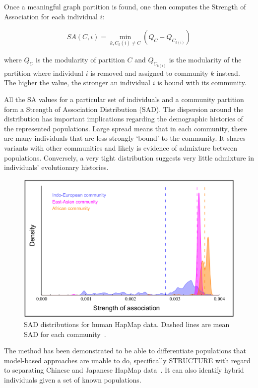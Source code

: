 \documentclass{essay}
\begin{document}
Once a meaningful graph partition is found, one then computes the Strength of
Association for each individual $i$:

\begin{align}
  SA(C, i) = \min_{k, C_k(i) \neq C} (Q_C - Q_{C_{{k}(i)}})
\end{align}

where $Q_C$ is the modularity of partition $C$ and $Q_{C_{{k}(i)}}$ is the
modularity of the partition where individual $i$ is removed and assigned to
community $k$ instead. The higher the value, the stronger an individual $i$ is
bound with its community.

All the SA values for a particular set of individuals and a community partition
form a Strength of Association Distribution (SAD). The dispersion around the
distribution has important implications regarding the demographic histories of
the represented populations. Large spread means that in each community, there
are many individuals that are less strongly `bound' to the community. It shares
variants with other communities and likely is evidence of admixture between
populations. Conversely, a very tight distribution suggests very little
admixture in individuals' evolutionary histories.

\begin{figure}
  \includegraphics[width=1\linewidth,keepaspectratio]{../Figures/fig12.png}
  \caption{SAD distributions for human HapMap data. Dashed lines are mean SAD
  for each community~\cite{greenbaum_inference_2016}.}
\end{figure}

The method has been demonstrated to be able to differentiate populations that
model-based approaches are unable to do, specifically STRUCTURE with regard to
separating Chinese and Japanese HapMap data~\cite{newman_modularity_2006}. It
can also identify hybrid individuals given a set of known populations.
\end{document}
